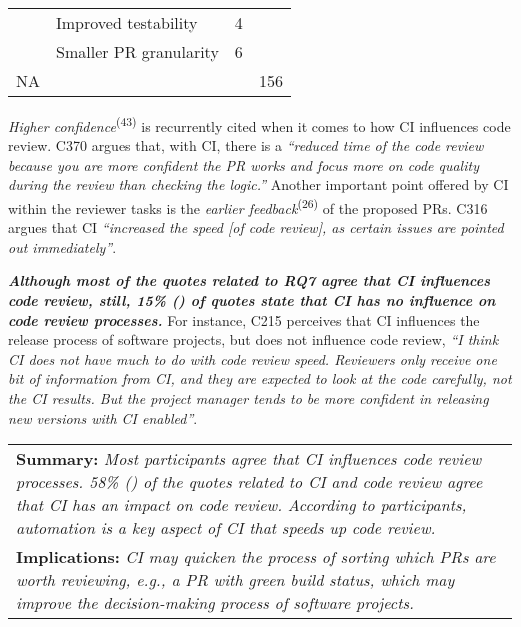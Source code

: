 \begin{table}
\begin{tabular}{p{11.0em}p{12.5em}cc}
			\cline{2-3}    \multicolumn{1}{c}{} & Improved testability & 4     &  \bigstrut\\
			\cline{2-3}    \multicolumn{1}{c}{} & Smaller PR granularity & 6     &  \bigstrut\\
			\hline
			{\centering NA}    &     &    & 156 \bigstrut\\
			\hline
		\end{tabular}%
		\label{tab:impact_of_CI_on_reviewing_process}%
	\end{table}%

	\textit{Higher confidence}\textsuperscript{(43)} is recurrently cited when it comes to how CI influences code review.  
	C370 argues that, with CI, there is a \textit{``reduced time of the code review because you are more confident the PR works and focus more on code quality during the review than checking the logic.''} Another important point offered by CI within the reviewer tasks is the \textit{earlier feedback}\textsuperscript{(26)} of the proposed PRs. 
	C316 argues that CI \textit{``increased the speed [of code review], as certain issues are pointed out immediately''}.

	\textit{\textbf{Although most of the quotes related to RQ7 agree that CI influences code review, still, 15\% () of quotes state that CI has no influence on code review processes.}} 
	For instance, C215 perceives that CI influences the release process of software projects, but does not influence code review, \textit{``I think CI does not have much to do with code review speed. Reviewers only receive one bit of information from CI, and they are expected to look at the code carefully, not the CI results. But the project manager tends to be more confident in releasing new versions with CI enabled''}.

	\begin{center}
		\begin{tabular}{|p{}|}
			\hline
			\textbf{Summary:}
			\textit{Most participants agree that CI influences code review processes. 58\% (\nicefrac{335}{578}) of the quotes related to CI and code review agree that CI has an impact on code review. According to participants, automation is a key aspect of CI that speeds up code review.}\\
			\textbf{Implications:}
			\textit{CI may quicken the process of sorting which PRs are worth reviewing, e.g., a PR with green build status, which may improve the decision-making process of software projects.}
			\\
			\hline
		\end{tabular}
	\end{center}